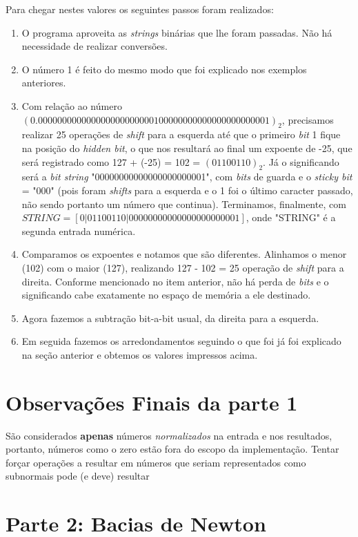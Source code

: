 \documentclass[11pt]{article}
\begin{document}
Para chegar nestes valores os seguintes passos foram realizados:
\begin{enumerate}
  \item O programa aproveita as \textit{strings} binárias que lhe foram passadas. Não há necessidade de realizar conversões.
  \item O número 1 é feito do mesmo modo que foi explicado nos exemplos anteriores.
  \item Com relação ao número $(0.000000000000000000000000100000000000000000000001)_2$, precisamos realizar 25 operações de \textit{shift} para a esquerda até que o primeiro \textit{bit} 1 fique na posição
  do \textit{hidden bit}, o que nos resultará ao final um expoente de -25, que será registrado como 127 + (-25) = 102 = $(01100110)_2$. Já o significando será a \textit{bit string} "00000000000000000000001", com
  \textit{bits} de guarda e o \textit{sticky bit} = "000" (pois foram \textit{shifts} para a esquerda e o 1 foi o último caracter passado, não sendo portanto um número que continua). Terminamos, finalmente, com
  {\small$STRING = [ 0 | 0 1 1 0 0 1 1 0 | 0 0 0 0 0 0 0 0 0 0 0 0 0 0 0 0 0 0 0 0 0 0 1 ] $}, onde "STRING" é a segunda entrada numérica.
  \item Comparamos os expoentes e notamos que são diferentes. Alinhamos o menor (102) com o maior (127), realizando 127 - 102 = 25 operação de \textit{shift} para a direita. Conforme mencionado no item anterior,
  não há perda de \textit{bits} e o significando cabe exatamente no espaço de memória a ele destinado.
  \item Agora fazemos a subtração bit-a-bit usual, da direita para a esquerda.
  \item Em seguida fazemos os arredondamentos seguindo o que foi já foi explicado na seção anterior e obtemos os valores impressos acima.
\end{enumerate}

\section{Observações Finais da parte 1}

\indent\indent São considerados \textbf{apenas} números \textit{normalizados} na entrada e nos resultados, portanto, números como o zero estão fora do escopo da implementação. Tentar forçar
operações a resultar em números que seriam representados como subnormais pode (e deve) resultar
\section{Parte 2: Bacias de Newton}
\end{document}
